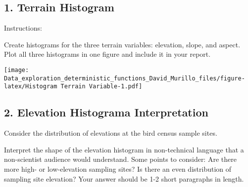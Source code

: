\documentclass[
]{article}
\newenvironment{Shaded}{\begin{snugshade}}{\end{snugshade}}
\newcommand{\AttributeTok}[1]{\textcolor[rgb]{0.77,0.63,0.00}{#1}}
\newcommand{\DecValTok}[1]{\textcolor[rgb]{0.00,0.00,0.81}{#1}}
\newcommand{\FunctionTok}[1]{\textcolor[rgb]{0.00,0.00,0.00}{#1}}
\newcommand{\NormalTok}[1]{#1}
\newcommand{\SpecialCharTok}[1]{\textcolor[rgb]{0.00,0.00,0.00}{#1}}
\newcommand{\StringTok}[1]{\textcolor[rgb]{0.31,0.60,0.02}{#1}}
\begin{document}
\hypertarget{terrain-histogram}{%
\subsection{\texorpdfstring{\textbf{1. Terrain
Histogram}}{1. Terrain Histogram}}\label{terrain-histogram}}

Instructions:

Create histograms for the three terrain variables: elevation, slope, and
aspect. Plot all three histograms in one figure and include it in your
report.

\begin{Shaded}
\end{Shaded}

\texttt{[image: Data\_exploration\_deterministic\_functions\_David\_Murillo\_files/figure-latex/Histogram Terrain Variable-1.pdf]}

\hypertarget{elevation-histograma-interpretation}{%
\subsection{\texorpdfstring{2. \textbf{Elevation Histograma
Interpretation}}{2. Elevation Histograma Interpretation}}\label{elevation-histograma-interpretation}}

Consider the distribution of elevations at the bird census sample sites.

Interpret the shape of the elevation histogram in non-technical language
that a non-scientist audience would understand. Some points to consider:
Are there more high- or low-elevation sampling sites? Is there an even
distribution of sampling site elevation? Your answer should be 1-2 short
paragraphs in length.
\end{document}
